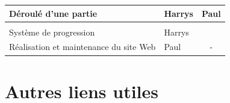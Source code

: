 \documentclass[french, 12pt]{article}
\begin{document}
\begin{table}[]
\begin{tabular}{|l|l|l|}
    Déroulé d'une partie                   & \cellcolor[HTML]{F8A102}Harrys     & \cellcolor[HTML]{9698ED}Paul       \\ \hline
    \multicolumn{3}{|l|}{\cellcolor[HTML]{343434}{\color[HTML]{FFFFFF} \textbf{Autre}}}                              \\ \hline
    Système de progression                 & \cellcolor[HTML]{F8A102}Harrys     &                                    \\ \hline
    Réalisation et maintenance du site Web & \cellcolor[HTML]{9698ED}Paul       & \multicolumn{1}{c|}{-}             \\ \hline
    \end{tabular}
    \end{table}

\newpage

\newpage

\newpage

\newpage

\section{Autres liens utiles}
\end{document}
